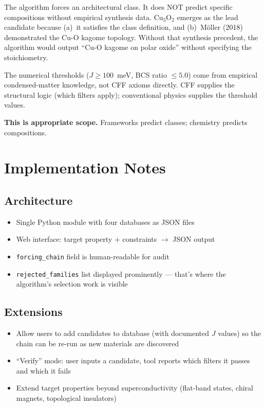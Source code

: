 \documentclass[11pt, a4paper]{article}
\begin{document}
The algorithm forces an architectural class. It does NOT predict
specific compositions without empirical synthesis data. Cu$_3$O$_2$
emerges as the lead candidate because (a)~it satisfies the class
definition, and (b)~M\"oller (2018) demonstrated the Cu-O kagome
topology. Without that synthesis precedent, the algorithm would
output ``Cu-O kagome on polar oxide'' without specifying the
stoichiometry.

The numerical thresholds ($J \geq 100$~meV, BCS ratio $\leq 5.0$)
come from empirical condensed-matter knowledge, not CFF axioms
directly. CFF supplies the structural logic (which filters apply);
conventional physics supplies the threshold values.

\textbf{This is appropriate scope.} Frameworks predict classes;
chemistry predicts compositions.

\section{Implementation Notes}

\subsection{Architecture}

\begin{itemize}[nosep]
  \item Single Python module with four databases as JSON files
  \item Web interface: target property + constraints $\to$ JSON output
  \item \texttt{forcing\_chain} field is human-readable for audit
  \item \texttt{rejected\_families} list displayed prominently ---
        that's where the algorithm's selection work is visible
\end{itemize}

\subsection{Extensions}

\begin{itemize}[nosep]
  \item Allow users to add candidates to database (with documented
        $J$ values) so the chain can be re-run as new materials are
        discovered
  \item ``Verify'' mode: user inputs a candidate, tool reports which
        filters it passes and which it fails
  \item Extend target properties beyond superconductivity (flat-band
        states, chiral magnets, topological insulators)
\end{itemize}
\end{document}
